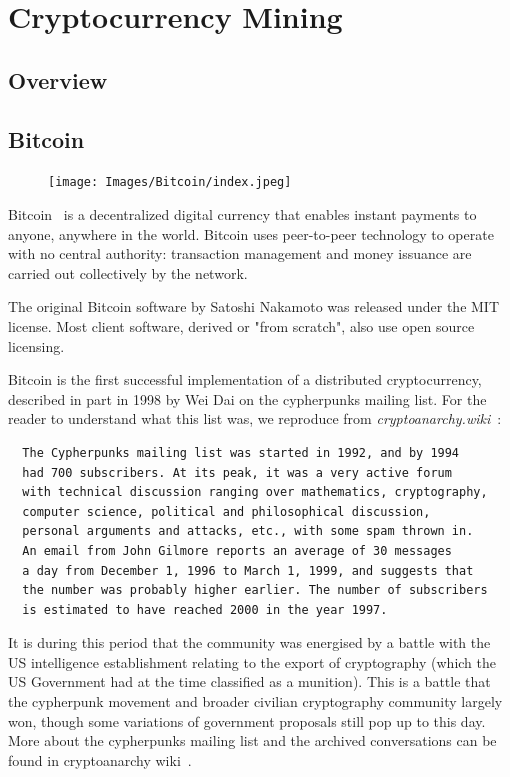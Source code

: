 \chapter{Cryptocurrency Mining}
%
\section{Overview}
%
\section{\label{sec:Bitcoin}Bitcoin}
\begin{figure}
\centering
\texttt{[image: Images/Bitcoin/index.jpeg]}
\end{figure}
Bitcoin~\cite{Nakamoto_bitcoin:a} is a decentralized digital currency that enables instant payments to anyone, anywhere in the world. Bitcoin uses peer-to-peer technology to operate with no central authority: transaction management and money issuance are carried out collectively by the network.

The original Bitcoin software by Satoshi Nakamoto was released under the MIT license. Most client software, derived or "from scratch", also use open source licensing.

Bitcoin is the first successful implementation of a distributed cryptocurrency, described in part in 1998 by Wei Dai on the cypherpunks mailing list. For the reader to understand what this list was, we reproduce from \emph{cryptoanarchy.wiki}~\cite{cryptoanarchy}:

\begin{verbatim}
  The Cypherpunks mailing list was started in 1992, and by 1994
  had 700 subscribers. At its peak, it was a very active forum
  with technical discussion ranging over mathematics, cryptography,
  computer science, political and philosophical discussion,
  personal arguments and attacks, etc., with some spam thrown in.
  An email from John Gilmore reports an average of 30 messages
  a day from December 1, 1996 to March 1, 1999, and suggests that
  the number was probably higher earlier. The number of subscribers
  is estimated to have reached 2000 in the year 1997.
\end{verbatim}

It is during this period that the community was energised by a battle with the US intelligence establishment relating to the export of cryptography (which the US Government had at the time classified as a munition). This is a battle that the cypherpunk movement and broader civilian cryptography community largely won, though some variations of government proposals still pop up to this day. More about the cypherpunks mailing list and the archived conversations can be found in cryptoanarchy wiki~\cite{cryptoanarchy}.


